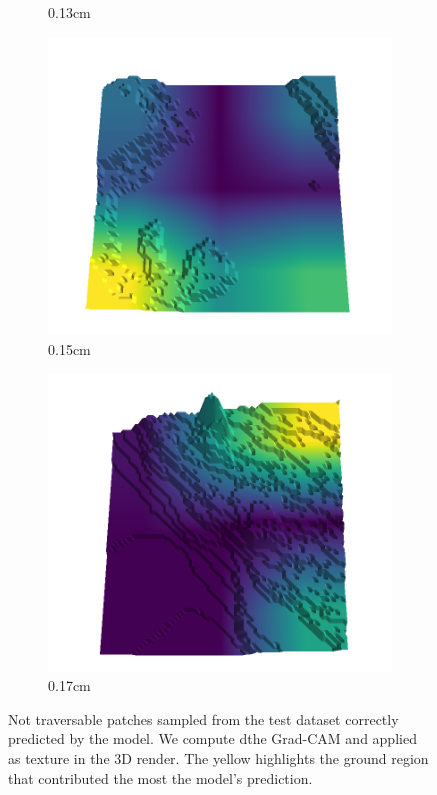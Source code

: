 \documentclass[../document.tex]{subfiles}
\begin{document}
\begin{figure}[H]
\begin{subfigure}[b]{0.192\linewidth}
        \caption{0.13cm}
        \label{fig : quarry-worst-18}
        \end{subfigure}
        \begin{subfigure}[b]{0.192\linewidth}
        \includegraphics[width=\linewidth]{../img/5/quarry/worst/15-patch-3d-majavi-colormap-180.png}
        \caption{0.15cm}
        \label{fig : quarry-worst-19}
        \end{subfigure}
        \begin{subfigure}[b]{0.192\linewidth}
        \includegraphics[width=\linewidth]{../img/5/quarry/worst/17-patch-3d-majavi-colormap-190.png}
        \caption{0.17cm}
        \label{fig : quarry-worst-20}
        \end{subfigure}
        \caption{Not traversable patches sampled from the test dataset correctly predicted by the model. We compute dthe Grad-CAM and applied as texture in the 3D render. The yellow highlights the ground region that contributed the most the model's prediction. }
        \label{fig : quarry-worst}
        \end{figure}
\end{document}
